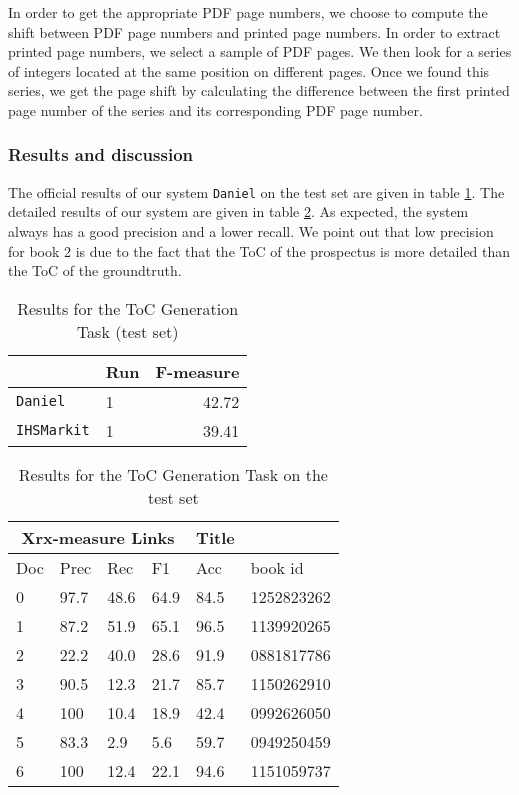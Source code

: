 In order to get the appropriate PDF page numbers, we choose to compute the shift
between PDF page numbers and printed page numbers. In order to
extract printed page numbers, we select a sample of PDF pages. We then
look for a series of integers located at the same position on
different pages. Once we found this series, we get the page shift by calculating
the difference between the first printed page number of the series and its
corresponding PDF page number.

\subsubsection{Results and discussion}

The official results of our system \texttt{Daniel} on the test set are given in table \ref{res:toc}.   
The detailed results of our system are given in table \ref{res:detail}.
As expected, the system always has a good precision and a lower recall.
We point out that low precision for book 2 is due to the fact that
the ToC of the prospectus is more detailed than the ToC of the groundtruth.

\begin{table}
\begin{tabular}{l|l|r}
     & Run & F-measure\\\hline
\texttt{Daniel}  & 1 &      42.72\\\hline
\texttt{IHSMarkit} & 1 &   39.41
\end{tabular}
\caption{Results for the ToC Generation Task (test set)}
\label{res:toc}
\end{table}


\begin{table}
\begin{tabular}{p{.5cm}|p{.6cm}|p{.6cm}|p{.6cm}|p{.6cm}|l}
  \multicolumn{4}{c|}{Xrx-measure Links}  &  Title & \\
\hline
 Doc &  Prec & Rec &    F1 &  Acc  & book id      \\\hline
   0 &  97.7 & 48.6 &  64.9 &  84.5  & 1252823262\\\hline
   1 &  87.2 & 51.9 &  65.1 &  96.5  & 1139920265\\\hline
   2 &  22.2 & 40.0 &  28.6 &  91.9  & 0881817786\\\hline
   3 &  90.5 & 12.3 &  21.7 &  85.7  & 1150262910\\\hline
   4 & 100 & 10.4 &  18.9 &  42.4  & 0992626050\\\hline
   5 &  83.3 &  2.9 &   5.6 &  59.7  & 0949250459\\\hline
   6 & 100 & 12.4 &  22.1 &  94.6  & 1151059737\\\hline
\end{tabular}
\caption{Results for the ToC Generation Task on the test set}
\label{res:detail}
\end{table}

